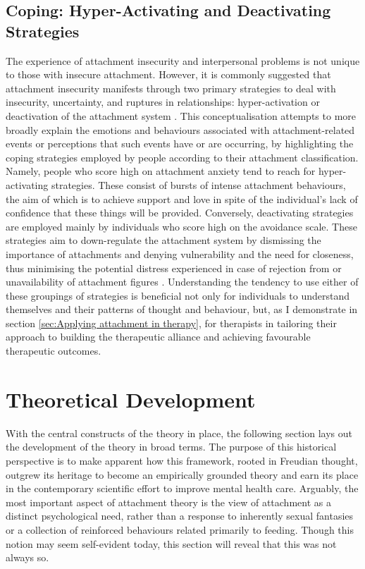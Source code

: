\documentclass[12pt]{report}
\begin{document}
\subsection*{Coping: Hyper-Activating and Deactivating Strategies}
The experience of attachment insecurity and interpersonal problems is not unique to those with insecure attachment.
However, it is commonly suggested that attachment insecurity manifests through two primary strategies to deal with insecurity, uncertainty, and ruptures in relationships: hyper-activation or deactivation of the attachment system \cite{Mikulincer2003, Mikulincer2013,Tyrrell1999, Slade2016}.
This conceptualisation attempts to more broadly explain the emotions and behaviours associated with attachment-related events or perceptions that such events have or are occurring, by highlighting the coping strategies employed by people according to their attachment classification.
Namely, people who score high on attachment anxiety tend to reach for hyper-activating strategies.
These consist of bursts of intense attachment behaviours, the aim of which is to achieve support and love in spite of the individual's lack of confidence that these things will be provided.
Conversely, deactivating strategies are employed mainly by individuals who score high on the avoidance scale.
These strategies aim to down-regulate the attachment system by dismissing the importance of attachments and denying vulnerability and the need for closeness, thus minimising the potential distress experienced in case of rejection from or unavailability of attachment figures \cite{Mikulincer2003}.
Understanding the tendency to use either of these groupings of strategies is beneficial not only for individuals to understand themselves and their patterns of thought and behaviour, but, as I demonstrate in section \ref{sec:Applying attachment in therapy}, for therapists in tailoring their approach to building the therapeutic alliance and achieving favourable therapeutic outcomes.

\section{Theoretical Development}
With the central constructs of the theory in place, the following section lays out the development of the theory in broad terms.
The purpose of this historical perspective is to make apparent how this framework, rooted in Freudian thought, outgrew its heritage to become an empirically grounded theory and earn its place in the contemporary scientific effort to improve mental health care.
Arguably, the most important aspect of attachment theory is the view of attachment as a distinct psychological need, rather than a response to inherently sexual fantasies or a collection of reinforced behaviours related primarily to feeding.
Though this notion may seem self-evident today, this section will reveal that this was not always so.
\end{document}
